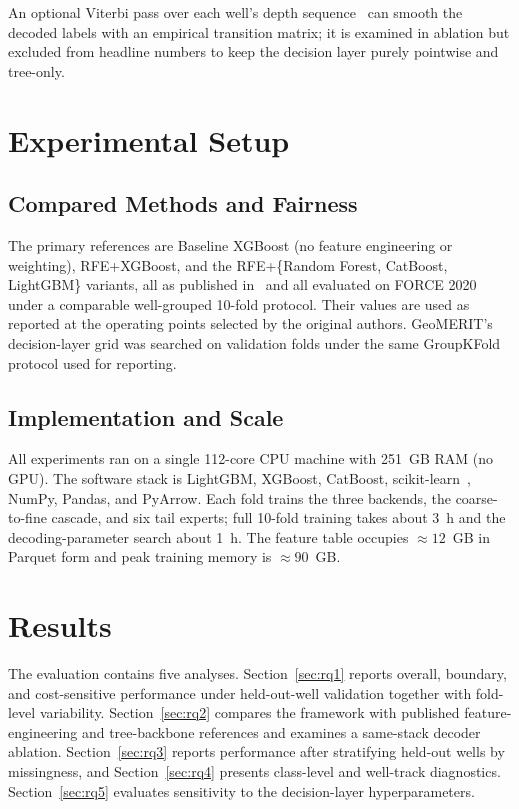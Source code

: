 \documentclass[bdcc,article,submit,pdftex,moreauthors]{Definitions/mdpi}
\begin{document}
An optional Viterbi pass over each well's depth sequence~\cite{viterbi1967,lafferty2001crf,sarawagi2004semimarkov}
can smooth the decoded labels with an empirical transition matrix; it is examined in
ablation but excluded from headline numbers to keep the decision layer purely pointwise and
tree-only.

\section{Experimental Setup}
\label{sec:setup}

\subsection{Compared Methods and Fairness}
\label{sec:compared}
The primary references are Baseline XGBoost (no feature engineering or weighting),
RFE+XGBoost, and the RFE+\{Random Forest, CatBoost, LightGBM\} variants, all as published
in~\cite{chen2026rfe} and all evaluated on FORCE 2020 under a comparable well-grouped 10-fold
protocol. Their values are used as reported at the operating points selected by the original
authors. GeoMERIT's decision-layer grid was searched on validation folds under the same
GroupKFold protocol used for reporting.

\subsection{Implementation and Scale}
\label{sec:impl}
All experiments ran on a single 112-core CPU machine with 251~GB RAM (no GPU). The software
stack is LightGBM, XGBoost, CatBoost, scikit-learn~\cite{pedregosa2011sklearn}, NumPy,
Pandas, and PyArrow. Each fold trains the three backends, the coarse-to-fine cascade, and
six tail experts; full 10-fold training takes about 3~h and the decoding-parameter search
about 1~h. The feature table occupies $\approx\!12$~GB in Parquet form and peak training
memory is $\approx\!90$~GB.

\section{Results}
\label{sec:results}
The evaluation contains five analyses. Section~\ref{sec:rq1} reports overall, boundary, and
cost-sensitive performance under held-out-well validation together with fold-level
variability. Section~\ref{sec:rq2} compares the framework with published feature-engineering
and tree-backbone references and examines a same-stack decoder ablation.
Section~\ref{sec:rq3} reports performance after stratifying held-out wells by missingness,
and Section~\ref{sec:rq4} presents class-level and well-track diagnostics.
Section~\ref{sec:rq5} evaluates sensitivity to the decision-layer hyperparameters.
\end{document}
